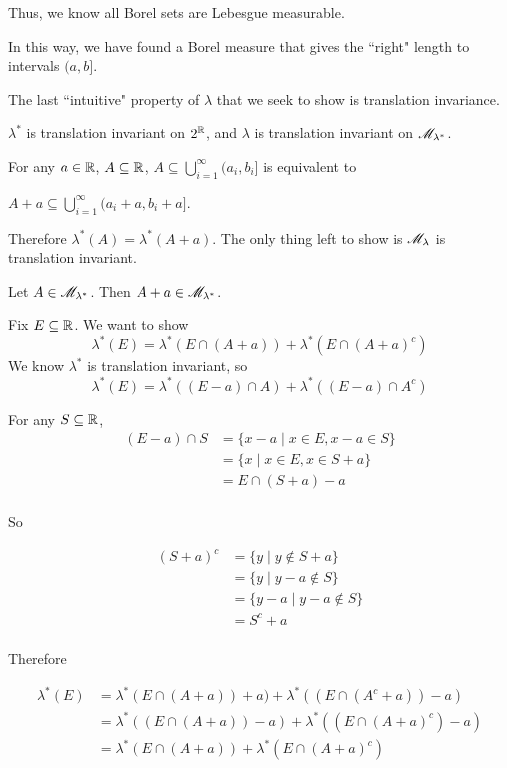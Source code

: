 \documentclass[x11names,reqno,14pt]{extarticle}
\newcommand*{\oo}{\infty}
\newcommand{\seq}[1]{_{#1 = 1}^\oo}
\begin{document}
Thus, we know all Borel sets are Lebesgue measurable. 

In this way, we have found a Borel measure that gives the ``right" length to intervals $(a, b]$. 

The last ``intuitive" property of $\lambda$ that we seek to show is translation invariance. 

\thm

$\lambda^*$ is translation invariant on $2^{\mathbb{R}}$, and $\lambda$ is translation invariant on $\mathscr{M}_{\lambda^*}$. 

\proof For any $a \in\mathbb{R}$, $A\subseteq\mathbb{R}$, $A\subseteq\bigcup\seq{i}(a_i, b_i]$ is equivalent to

$A + a \subseteq\bigcup\seq{i}(a_i + a, b_i + a]$. 

Therefore $\lambda^*(A) = \lambda^*(A + a)$. The only thing left to show is $\mathscr{M}_{\lambda}$ is translation invariant. 

\claim Let $A \in \mathscr{M}_{\lambda^*}$. Then $A + a \in \mathscr{M}_{\lambda^*}$. 

\proof

Fix $E\subseteq\mathbb{R}$. We want to show 
\[
\lambda^*(E) = \lambda^*(E \cap (A + a)) + \lambda^*(E\cap (A + a)^c) 
\]
We know $\lambda^*$ is translation invariant, so 
\[
\lambda^*(E) = \lambda^*((E - a) \cap A) + \lambda^*((E - a) \cap A^c)
\]

For any $S\subseteq\mathbb{R}$, 
\begin{align*}
(E - a) \cap S & = \{x - a \mid x \in E, x - a \in S \} \\
					& = \{x \mid x \in E, x \in S + a\} \\
					& = E \cap(S + a) - a \\
\end{align*}

So

\begin{align*}
(S + a)^c & = \{y \mid y \not\in S + a\} \\
			 & = \{y \mid y - a \not\in S\} \\
			 & = \{y - a \mid y - a \not\in S\} \\
			 & = S^c + a \\
\end{align*}

Therefore

\begin{align*}
\lambda^*(E) & = \lambda^*(E \cap (A + a)) + a) + \lambda^*((E \cap (A^c + a)) - a) \\
				 & = \lambda^*((E\cap(A + a)) - a) + \lambda^*((E\cap(A + a)^c) - a) \\
				 & = \lambda^*(E\cap(A + a)) + \lambda^*(E\cap (A + a)^c) \\
\end{align*}
\end{document}
